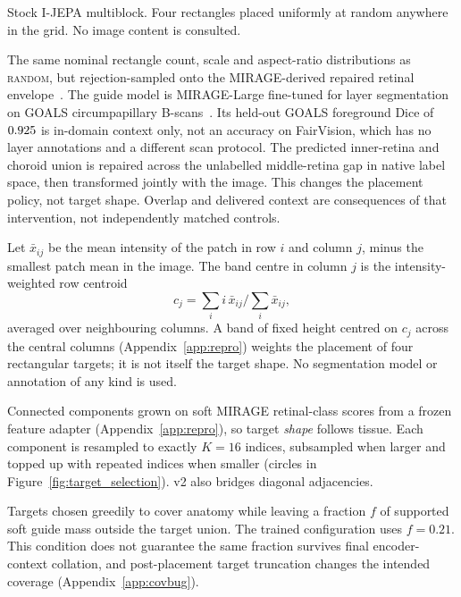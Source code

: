 \documentclass{article}
\newcommand{\ArmBest}{\textsc{centroid}}
\begin{document}
\begin{description}
\setlength{\itemsep}{1pt}\setlength{\parskip}{0pt}
\item[\textsc{random} (baseline).] Stock I-JEPA multiblock. Four rectangles placed
  uniformly at random anywhere in the grid. No image content is consulted.

\item[\textsc{envelope} (random-within-retina).] The same nominal rectangle
count, scale and aspect-ratio distributions as \textsc{random}, but
rejection-sampled onto the MIRAGE-derived repaired retinal
envelope~\citep{morano2025mirage}. The guide model is MIRAGE-Large fine-tuned
for layer segmentation on GOALS circumpapillary
B-scans~\citep{fang2022goals}. Its held-out GOALS foreground Dice of
$0.925$ is in-domain context only, not an accuracy on FairVision, which
has no layer annotations and a different scan protocol. The predicted
inner-retina and choroid union is repaired across the unlabelled middle-retina
gap in native label space, then transformed jointly with the image. This
  changes the placement policy, not target shape. Overlap and delivered context
  are consequences of that intervention, not independently matched controls.

\item[\ArmBest{} (segmentation-free).] Let $\bar x_{ij}$ be the mean intensity
  of the patch in row $i$ and column $j$, minus the smallest patch mean in the
  image. The band
  centre in column $j$ is the intensity-weighted row centroid
  \begin{equation}
   c_j=\textstyle\sum_i i\,\bar x_{ij}\big/\sum_i \bar x_{ij},
   \label{eq:centroid}
  \end{equation}
  averaged over neighbouring columns. A band of fixed height centred on $c_j$
  across the central columns (Appendix~\ref{app:repro}) weights the placement of
  four rectangular targets; it is not itself the target shape. No segmentation
  model or annotation of any kind is used.

\item[\textsc{anatomy-v1} / \textsc{anatomy-v2}.] Connected components
  grown on soft MIRAGE retinal-class scores from a frozen feature adapter
  (Appendix~\ref{app:repro}), so target \emph{shape} follows tissue. Each
  component is resampled to exactly $K{=}16$ indices, subsampled when larger and
  topped up with repeated indices when smaller (circles in
  Figure~\ref{fig:target_selection}). v2 also bridges diagonal adjacencies.

\item[\textsc{cover} $f$.] Targets chosen greedily to cover anatomy while
  leaving a fraction $f$ of supported soft guide mass outside the target union. The trained configuration uses
  $f{=}0.21$. This condition does not guarantee the same fraction survives
  final encoder-context collation, and post-placement target truncation changes
  the intended coverage (Appendix~\ref{app:covbug}).
\end{description}
\end{document}

